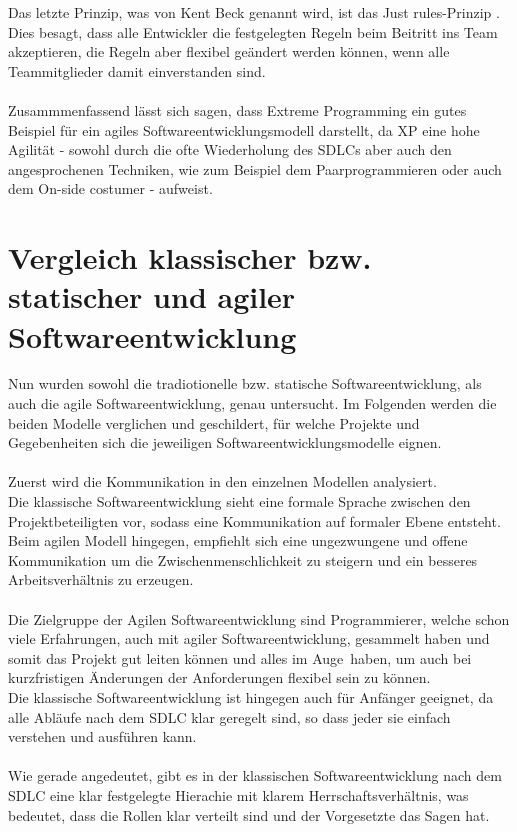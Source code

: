 \documentclass[a4paper, 10pt]{scrartcl}
\begin{document}
Das letzte Prinzip, was von Kent Beck genannt wird, ist das \glqq Just rules\grqq -Prinzip \citep{beck1999}. Dies besagt, dass alle Entwickler die festgelegten Regeln beim Beitritt ins Team akzeptieren, die Regeln aber flexibel geändert werden können, wenn alle Teammitglieder damit einverstanden sind.\\\\
Zusammmenfassend lässt sich sagen, dass Extreme Programming ein gutes Beispiel für ein agiles Softwareentwicklungsmodell darstellt, da XP eine hohe Agilität - sowohl durch die ofte Wiederholung des SDLCs aber auch den angesprochenen Techniken, wie zum Beispiel dem Paarprogrammieren oder auch dem On-side costumer - aufweist.


\section{Vergleich klassischer bzw. statischer und agiler Softwareentwicklung}
Nun wurden sowohl die tradiotionelle bzw. statische Softwareentwicklung, als auch die agile Softwareentwicklung, genau untersucht. Im Folgenden werden die beiden Modelle verglichen und geschildert, für welche Projekte und Gegebenheiten sich die jeweiligen Softwareentwicklungsmodelle eignen.\\\\
Zuerst wird die Kommunikation in den einzelnen Modellen analysiert.\\
Die klassische Softwareentwicklung sieht eine formale Sprache zwischen den Projektbeteiligten vor, sodass eine Kommunikation auf formaler Ebene entsteht.\\
Beim agilen Modell hingegen, empfiehlt sich eine ungezwungene und offene Kommunikation um die Zwischenmenschlichkeit zu steigern und ein besseres Arbeitsverhältnis zu erzeugen.\\\\
Die Zielgruppe der Agilen Softwareentwicklung sind Programmierer, welche schon viele Erfahrungen, auch mit agiler Softwareentwicklung, gesammelt haben und somit das Projekt gut leiten können und alles \glqq im Auge\grqq\ haben, um auch bei kurzfristigen Änderungen der Anforderungen flexibel sein zu können.\\
Die klassische Softwareentwicklung ist hingegen auch für Anfänger geeignet, da alle Abläufe nach dem SDLC klar geregelt sind, so dass jeder sie einfach verstehen und ausführen kann.\\\\
Wie gerade angedeutet, gibt es in der klassischen Softwareentwicklung nach dem SDLC eine klar festgelegte Hierachie mit klarem \glqq Herrschaftsverhältnis\grqq{}, was bedeutet, dass die Rollen klar verteilt sind und der Vorgesetzte \glqq das Sagen\grqq{} hat.\\
\end{document}
